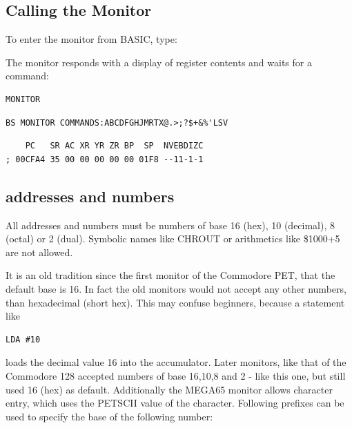 \subsection {Calling the Monitor}

To enter the monitor from BASIC, type:

The monitor responds with a display of register contents and waits for a command:

\begin{tcolorbox}[colback=blue,coltext=white]
\verbatimfont{\codefont}
\begin{verbatim}
MONITOR
\end{verbatim}
\begin{tcolorbox}[colback=yellow,coltext=blue,,arc=0mm,boxrule=0mm,
       left*=0.5mm,right*=0mm,top=0mm,bottom=0mm,nobeforeafter,
       left skip=0.1mm,
       width=50mm,height=3mm,valign=center]
\begin{verbatim}
BS MONITOR COMMANDS:ABCDFGHJMRTX@.>;?$+&%'LSV
\end{verbatim}
\end{tcolorbox}
\begin{verbatim}
    PC   SR AC XR YR ZR BP  SP  NVEBDIZC
; 00CFA4 35 00 00 00 00 00 01F8 --11-1-1
\end{verbatim}
\end{tcolorbox}

\subsection{addresses and numbers}

All addresses and numbers must be numbers of base 16 (hex),
10 (decimal), 8 (octal) or 2 (dual). Symbolic names like CHROUT
or arithmetics like \$1000+5 are not allowed.

It is an old tradition since the first monitor of the Commodore PET,
that the default base is 16. In fact the old monitors would not
accept any other numbers, than hexadecimal (short hex).
This may confuse beginners, because a statement like
\begin{verbatim}
LDA #10
\end{verbatim}
loads the decimal value 16 into the accumulator.
Later monitors, like that of the Commodore 128 accepted numbers of
base 16,10,8 and 2 - like this one, but still used 16 (hex) as default.
Additionally the MEGA65 monitor allows character entry, which uses
the PETSCII value of the character.
Following prefixes can be used to specify the base of the following number:


